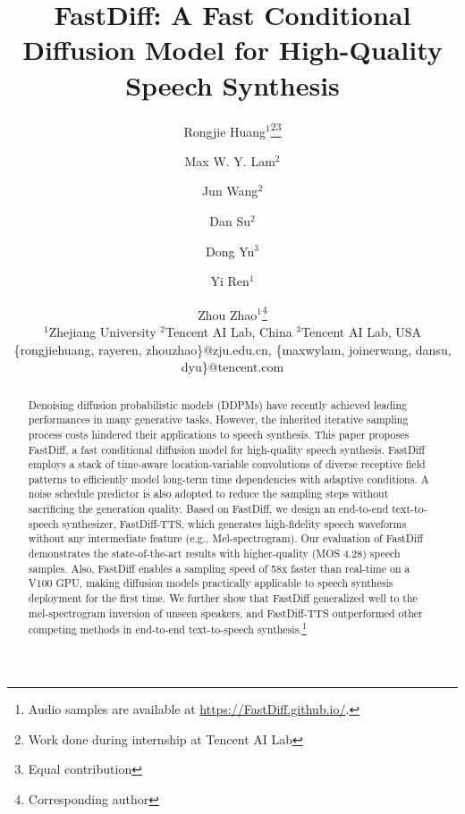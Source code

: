 \documentclass{article}
\title{FastDiff: A Fast Conditional Diffusion Model for High-Quality Speech Synthesis}
\author{
Rongjie Huang$^1$\footnote{Work done during internship at Tencent AI Lab}\footnote{Equal contribution}\and
Max W. Y. Lam$^2$\footnotemark[2]\and
Jun Wang$^2$\and
Dan Su$^2$\and
Dong Yu$^3$\and
Yi Ren$^1$\and
Zhou Zhao$^1$\footnote{Corresponding author}\\
\affiliations
$^1$Zhejiang University \quad
$^2$Tencent AI Lab, China \quad
$^3$Tencent AI Lab, USA\\
\emails
\{rongjiehuang, rayeren, zhouzhao\}@zju.edu.cn,
\{maxwylam, joinerwang, dansu, dyu\}@tencent.com
}
\begin{document}
\maketitle
\begin{abstract}
Denoising diffusion probabilistic models (DDPMs) have recently achieved leading performances in many generative tasks. However, the inherited iterative sampling process costs hindered their applications to speech synthesis. This paper proposes FastDiff, a fast conditional diffusion model for high-quality speech synthesis. FastDiff employs a stack of time-aware location-variable convolutions of diverse receptive field patterns to efficiently model long-term time dependencies with adaptive conditions. A noise schedule predictor is also adopted to reduce the sampling steps without sacrificing the generation quality. Based on FastDiff, we design an end-to-end text-to-speech synthesizer, FastDiff-TTS, which generates high-fidelity speech waveforms without any intermediate feature (e.g., Mel-spectrogram). Our evaluation of FastDiff demonstrates the state-of-the-art results with higher-quality (MOS 4.28) speech samples. Also, FastDiff enables a sampling speed of 58x faster than real-time on a V100 GPU, making diffusion models practically applicable to speech synthesis deployment for the first time. We further show that FastDiff generalized well to the mel-spectrogram inversion of unseen speakers, and FastDiff-TTS outperformed other competing methods in end-to-end text-to-speech synthesis.\footnote{Audio samples are available at \url{https://FastDiff.github.io/}.}

\end{abstract}

  









\clearpage




\appendix
\clearpage

\end{document}
